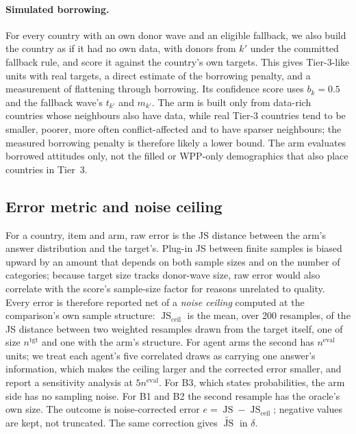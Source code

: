 \documentclass[10pt]{article}
\begin{document}
\paragraph{Simulated borrowing.} For every country with an own donor wave and an eligible fallback, we also build the country as if it had no own data, with donors from $k'$ under the committed fallback rule, and score it against the country's own targets. This gives Tier-3-like units with real targets, a direct estimate of the borrowing penalty, and a measurement of flattening through borrowing. Its confidence score uses $b_k=0.5$ and the fallback wave's $t_{k'}$ and $m_{k'}$. The arm is built only from data-rich countries whose neighbours also have data, while real Tier-3 countries tend to be smaller, poorer, more often conflict-affected and to have sparser neighbours; the measured borrowing penalty is therefore likely a lower bound. The arm evaluates borrowed attitudes only, not the filled or WPP-only demographics that also place countries in Tier~3.

\subsection{Error metric and noise ceiling}
\label{sec:noise}

For a country, item and arm, raw error is the JS distance between the arm's answer distribution and the target's. Plug-in JS between finite samples is biased upward by an amount that depends on both sample sizes and on the number of categories; because target size tracks donor-wave size, raw error would also correlate with the score's sample-size factor for reasons unrelated to quality. Every error is therefore reported net of a \emph{noise ceiling} computed at the comparison's own sample structure: $\operatorname{JS}_{\text{ceil}}$ is the mean, over 200 resamples, of the JS distance between two weighted resamples drawn from the target itself, one of size $n^{\text{tgt}}$ and one with the arm's structure. For agent arms the second has $n^{\text{eval}}$ units; we treat each agent's five correlated draws as carrying one answer's information, which makes the ceiling larger and the corrected error smaller, and report a sensitivity analysis at $5n^{\text{eval}}$. For B3, which states probabilities, the arm side has no sampling noise. For B1 and B2 the second resample has the oracle's own size. The outcome is noise-corrected error $e = \operatorname{JS} - \operatorname{JS}_{\text{ceil}}$; negative values are kept, not truncated. The same correction gives $\widetilde{\operatorname{JS}}$ in $\delta$.
\end{document}
